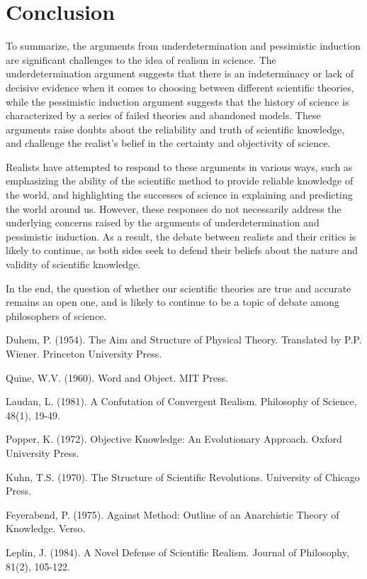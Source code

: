 \documentclass[12pt]{article}
\begin{document}
	\section*{Conclusion}
	To summarize, the arguments from underdetermination and pessimistic induction are significant challenges to the idea of realism in science. The underdetermination argument suggests that there is an indeterminacy or lack of decisive evidence when it comes to choosing between different scientific theories, while the pessimistic induction argument suggests that the history of science is characterized by a series of failed theories and abandoned models. These arguments raise doubts about the reliability and truth of scientific knowledge, and challenge the realist's belief in the certainty and objectivity of science.

	Realists have attempted to respond to these arguments in various ways, such as emphasizing the ability of the scientific method to provide reliable knowledge of the world, and highlighting the successes of science in explaining and predicting the world around us. However, these responses do not necessarily address the underlying concerns raised by the arguments of underdetermination and pessimistic induction. As a result, the debate between realists and their critics is likely to continue, as both sides seek to defend their beliefs about the nature and validity of scientific knowledge.

	In the end, the question of whether our scientific theories are true and accurate remains an open one, and is likely to continue to be a topic of debate among philosophers of science.

\begin{thebibliography}{9}
	Duhem, P. (1954). The Aim and Structure of Physical Theory. Translated by P.P. Wiener. Princeton University Press.

	Quine, W.V. (1960). Word and Object. MIT Press.

	Laudan, L. (1981). A Confutation of Convergent Realism. Philosophy of Science, 48(1), 19-49.

	Popper, K. (1972). Objective Knowledge: An Evolutionary Approach. Oxford University Press.

	Kuhn, T.S. (1970). The Structure of Scientific Revolutions. University of Chicago Press.

	Feyerabend, P. (1975). Against Method: Outline of an Anarchistic Theory of Knowledge. Verso.

	Leplin, J. (1984). A Novel Defense of Scientific Realism. Journal of Philosophy, 81(2), 105-122.
\end{thebibliography}
\end{document}
